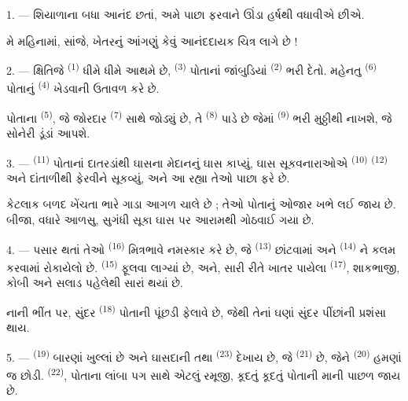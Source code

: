 \VUsaut{3.0mm}
\VUsaut{3.0mm}

\VUsaut{4.0mm}

1. --- શિયાળાના બધા આનંદ છતાં, અમે  પાછા ફરવાને ઊંડા
હર્ષથી વધાવીએ છીએ.

મે મહિનામાં, સાંજે, ખેતરનું આંગણું કેવું આનંદદાયક ચિત્ર લાગે છે !

2. --- ક્ષિતિજે  \textsuperscript{(1)} ધીમે ધીમે આથમે છે,
 \textsuperscript{(3)} પોતાનાં જાંબુડિયાં
 \textsuperscript{(2)} ભરી દેતો. મહેનતુ 
\textsuperscript{(6)} પોતાનું  \textsuperscript{(4)} ખેડવાની
ઉતાવળ કરે છે.

પોતાના  \textsuperscript{(5)}, જે જોરદાર 
\textsuperscript{(7)} સાથે જોડ્યું છે, તે 
\textsuperscript{(8)} પાડે છે જેમાં 
\textsuperscript{(9)} ભરી મુઠ્ઠીથી  નાખશે, જે સોનેરી ડૂંડાં
આપશે.

3. ---  \textsuperscript{(11)} પોતાનાં દાતરડાંથી
ઘાસના મેદાનનું ઘાસ કાપ્યું, ઘાસ સૂકવનારાઓએ 
\textsuperscript{(10)}  \textsuperscript{(12)} અને
દાંતાળીથી ફેરવીને સૂકવ્યું, અને આ રહ્યા તેઓ પાછા ફરે છે.

કેટલાક બળદ ખેંચતા ભારે ગાડા આગળ ચાલે છે ; તેઓ પોતાનું ઓજાર ખભે લઈ
જાય છે. બીજા, વધારે આળસુ, સુગંધી સૂકા ઘાસ પર આરામથી ગોઠવાઈ ગયા છે.

4. --- પસાર થતાં તેઓ  \textsuperscript{(16)} મિત્રભાવે
નમસ્કાર કરે છે, જે  \textsuperscript{(13)}
 છાંટવામાં અને 
\textsuperscript{(14)} ને કલમ કરવામાં રોકાયેલો છે.  \textsuperscript{(15)} ફૂલવા લાગ્યાં છે, અને, સારી રીતે ખાતર
પાયેલા  \textsuperscript{(17)}, શાકભાજી, કોબી અને
સલાડ પહેલેથી સારાં થયાં છે.

નાની ભીંત પર, સુંદર  \textsuperscript{(18)} પોતાની પૂંછડી
ફેલાવે છે, જેથી તેનાં ઘણાં સુંદર પીંછાંની પ્રશંસા થાય.

\VUsaut{3.0mm}

5. ---  \textsuperscript{(19)} બારણાં ખુલ્લાં છે અને
ઘાસદાની તથા  \textsuperscript{(23)} દેખાય છે, જે
 \textsuperscript{(21)} છે, જેને 
\textsuperscript{(20)} હમણાં જ છોડી. 
\textsuperscript{(22)}, પોતાના લાંબા પગ સાથે એટલું રમૂજી, કૂદતું કૂદતું
પોતાની માની પાછળ જાય છે.

